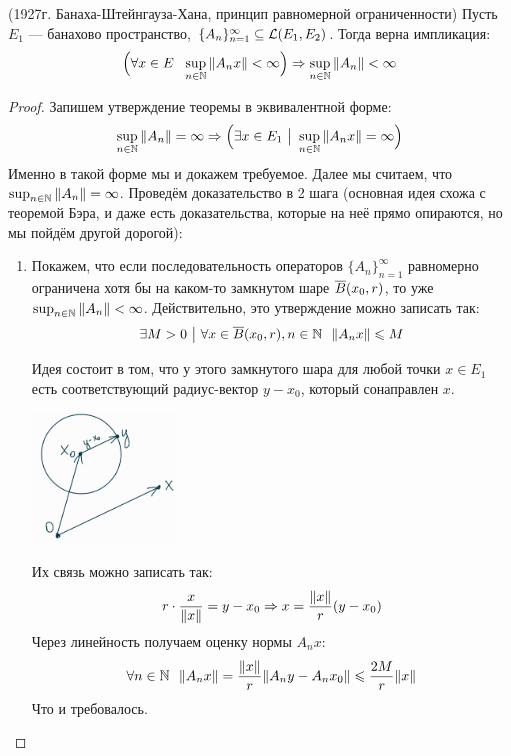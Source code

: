 \begin{theorem} (1927г. Банаха-Штейнгауза-Хана, принцип равномерной ограниченности)
	Пусть $E_1$ --- банахово пространство, $\{A_n\}_{n = 1}^\infty \subseteq \mathcal{L}(E_1, E_2)$. Тогда верна импликация:
	\[
		\Big(\forall x \in E\ \ \sup_{n \in \mathbb{N}} \|A_n x\| < \infty\Big) \Rightarrow \sup_{n \in \mathbb{N}} \|A_n\| < \infty
	\]
\end{theorem}

\begin{proof}
	Запишем утверждение теоремы в эквивалентной форме:
	\[
		\sup_{n \in \mathbb{N}} \|A_n\| = \infty \Rightarrow \Big(\exists x \in E_1 \ \big|\  \sup_{n \in \mathbb{N}} \|A_nx\| = \infty\Big)
	\]
	Именно в такой форме мы и докажем требуемое. Далее мы считаем, что $\sup_{n \in \mathbb{N}} \|A_n\| = \infty$. Проведём доказательство в 2 шага (основная идея схожа с теоремой Бэра, и даже есть доказательства, которые на неё прямо опираются, но мы пойдём другой дорогой):
	\begin{enumerate}
		\item Покажем, что если последовательность операторов $\{A_n\}_{n = 1}^\infty$ равномерно ограничена хотя бы на каком-то замкнутом шаре $\overline{B}(x_0, r)$, то уже $\sup_{n \in \mathbb{N}} \|A_n\| < \infty$. Действительно, это утверждение можно записать так:
		\[
			\exists M > 0 \ \big|\  \forall x \in \overline{B}(x_0, r), n \in \mathbb{N}\ \ \|A_nx\| \leqslant M
		\]
		
		Идея состоит в том, что у этого замкнутого шара для любой точки $x \in E_1$ есть соответствующий радиус-вектор $y - x_0$, который сонаправлен $x$.
		
		\begin{center}
			\includegraphics[width=0.3\textwidth]{images/3pic.png}
		\end{center}
		
		Их связь можно записать так:
		\[
			r \cdot \frac{x}{\|x\|} = y - x_0 \Rightarrow x = \frac{\|x\|}{r}(y - x_0)
		\]
		Через линейность получаем оценку нормы $A_nx$:
		\[
			\forall n \in \mathbb{N}\ \ \|A_nx\| = \frac{\|x\|}{r}\|A_ny - A_nx_0\| \leqslant \frac{2M}{r}\|x\|
		\]
		Что и требовалось.
		

\end{enumerate}
\end{proof}
